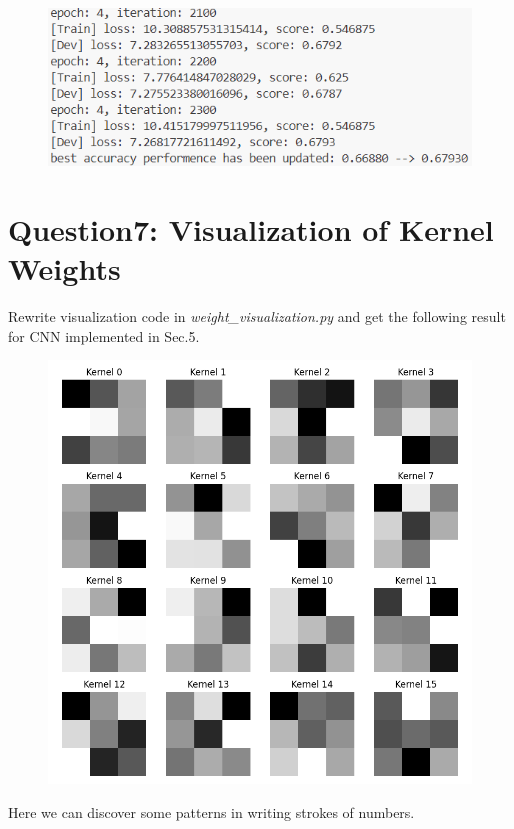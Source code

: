 \documentclass[]{article}
\begin{document}
\begin{figure}[H]
	\centering
	\includegraphics[width=0.7\linewidth]{Q6_2}
	\caption{}
	\label{fig:q62}
\end{figure}

\section{Question7: Visualization of Kernel Weights}
Rewrite visualization code in \textit{weight\_visualization.py} and get the following result for CNN implemented in Sec.5.

\begin{figure}[H]
	\centering
	\includegraphics[width=0.55\linewidth]{kernels}
	\caption{}
	\label{fig:kernels}
\end{figure}

Here we can discover some patterns in writing strokes of numbers.
\end{document}
